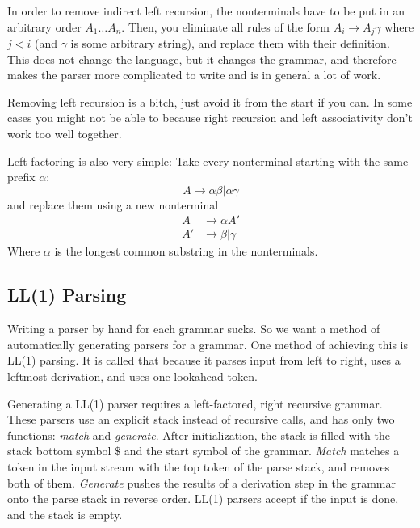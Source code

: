 \documentclass{article}
\begin{document}
In order to remove indirect left recursion, the nonterminals have to be put in an arbitrary order $A_1 \dots A_n$.
Then, you eliminate all rules of the form $A_i \rightarrow A_j \gamma$ where $j<i$ (and $\gamma$ is some arbitrary string), and replace them with their definition.
This does not change the language, but it changes the grammar, and therefore makes the parser more complicated to write and is in general a lot of work.

\begin{keypointbox}
	Removing left recursion is a bitch, just avoid it from the start if you can.
	In some cases you might not be able to because right recursion and left associativity don't work too well together.
\end{keypointbox}

Left factoring is also very simple: Take every nonterminal starting with the same prefix $\alpha$:
\begin{equation}
	A \rightarrow \alpha \beta | \alpha \gamma
\end{equation}
and replace them using a new nonterminal
\begin{align}
	A &\rightarrow \alpha A'\\
	A' &\rightarrow \beta | \gamma
\end{align}
Where $\alpha$ is the longest common substring in the nonterminals.

\subsection{LL(1) Parsing}
Writing a parser by hand for each grammar sucks.
So we want a method of automatically generating parsers for a grammar.
One method of achieving this is LL(1) parsing.
It is called that because it parses input from left to right, uses a leftmost derivation, and uses one lookahead token.

Generating a LL(1) parser requires a left-factored, right recursive grammar.
These parsers use an explicit stack instead of recursive calls, and has only two functions: \emph{match} and \emph{generate}.
After initialization, the stack is filled with the stack bottom symbol $\$$ and the start symbol of the grammar.
\emph{Match} matches a token in the input stream with the top token of the parse stack, and removes both of them.
\emph{Generate} pushes the results of a derivation step in the grammar onto the parse stack in reverse order.
LL(1) parsers accept if the input is done, and the stack is empty.
\end{document}
